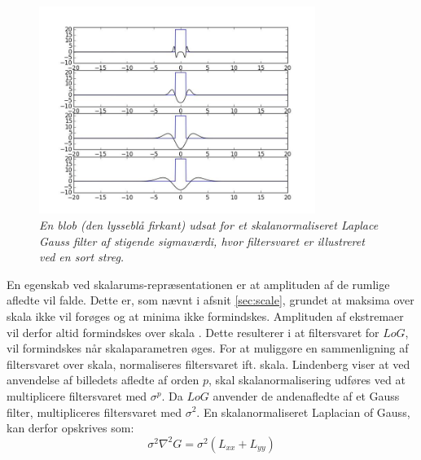 \begin{figure}[H]
    \centering
    \includegraphics[width=0.80\textwidth]{fig/42.jpg}
    \vspace{-0.75em}
    \begin{center}
    \caption{{\footnotesize \textit{En blob (den lysseblå firkant) udsat for et skalanormaliseret Laplace Gauss filter af stigende sigmaværdi, hvor filtersvaret er illustreret ved en sort streg.
}}}
    \label{fig:laprespons}
     \end{center}
  \end{figure}
       \vspace{-2.7em}
\noindent
En egenskab ved skalarums-repræsentationen er at amplituden af de rumlige afledte vil falde. Dette er, som nævnt i afsnit \ref{sec:scale}, grundet at maksima over skala ikke vil forøges og at minima ikke formindskes. Amplituden af ekstremaer vil derfor altid formindskes over skala \cite{phdlind}. Dette resulterer i at filtersvaret for $LoG$, vil formindskes når skalaparametren øges. For at muliggøre en sammenligning af filtersvaret over skala, normaliseres filtersvaret ift. skala.  Lindenberg \cite{lindenscale} viser at ved anvendelse af billedets afledte af orden $p$, skal skalanormalisering udføres ved at multiplicere filtersvaret med $\sigma^p$. Da $LoG$ anvender de andenafledte af et Gauss filter, multipliceres filtersvaret med $\sigma^2$. En skalanormaliseret Laplacian of Gauss, kan derfor opskrives som:
\begin{equation}
\sigma^2 \nabla^2G = \sigma^2(L_{xx}+L_{yy})
\end{equation}